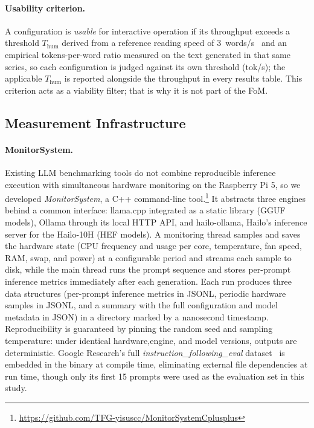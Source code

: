 \documentclass[acmsmall,natbib=false]{acmart}
\begin{document}
\paragraph{Usability criterion.}
A configuration is \emph{usable} for interactive operation if its throughput
exceeds a threshold $T_{\mathrm{hum}}$ derived from a reference reading speed
of 3~words/s~\cite{whatmough_generative_2025} and an empirical
tokens-per-word ratio measured on the text generated in that same series, so
each configuration is judged against its own threshold (tok/s); the applicable
$T_{\mathrm{hum}}$ is reported alongside the throughput in every results
table. This criterion acts as a viability filter; that is why it is not part
of the FoM.

\subsection{Measurement Infrastructure}\label{sec:infrastructure}

\paragraph{MonitorSystem.}
Existing LLM benchmarking tools do not combine reproducible inference
execution with simultaneous hardware monitoring on the Raspberry Pi 5, so we
developed \textit{MonitorSystem}, a C++ command-line
tool.\footnote{\url{https://github.com/TFG-yisuscc/MonitorSystemCplusplus}}
It abstracts three engines behind a common interface: llama.cpp integrated as
a static library (GGUF models), Ollama through its local HTTP API, and
hailo-ollama, Hailo's inference server for the Hailo-10H (HEF models). A
monitoring thread samples and saves the hardware state (CPU frequency and usage per
core, temperature, fan speed, RAM, swap, and power) at a configurable period and
streams each sample to disk, while the main thread runs the prompt sequence
and stores per-prompt inference metrics immediately after each generation.
Each run produces three data structures (per-prompt inference metrics in JSONL,
periodic hardware samples in JSONL, and a summary with the full configuration
and model metadata in JSON) in a directory marked by a nanosecond timestamp.
Reproducibility is guaranteed by pinning the random seed and sampling temperature:
under identical hardware,engine, and model versions, outputs are deterministic.
Google Research's full \textit{instruction\_following\_eval}
dataset~\cite{zhou_instruction-following_2023} is embedded in the binary at
compile time, eliminating external file dependencies at run time, though
only its first 15 prompts were used as the evaluation set in this study.
\end{document}
